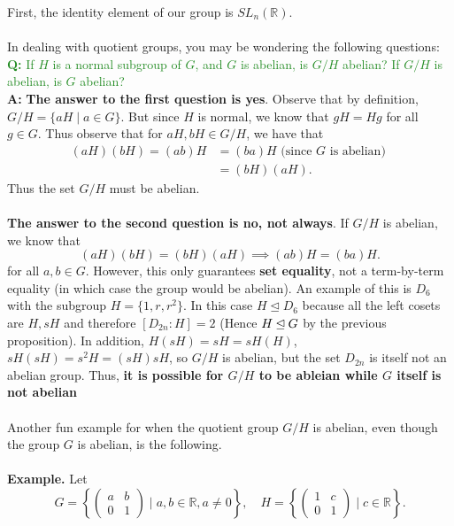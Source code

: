     First, the identity element of our group is $SL_n(\mathbb{R})$.
    \\
    \\
    \indent In dealing with quotient groups, you may be wondering the
    following questions:\\
    \textcolor{ForestGreen}{\textbf{Q:} If $H$ is a normal subgroup of
    $G$, and $G$ is abelian, is $G/H$ abelian? If $G/H$ is abelian, is
    $G$ abelian?}
    \\
    \textbf{A:} \textbf{The answer to the first question is yes}. 
    Observe that
        by definition, $G/H = \{aH \mid a \in G\}.$ But since $H$ 
        is normal, we know that $gH = Hg$ for all $g \in G$. 
        Thus observe that for $aH, bH \in G/H$, we have that 
        \begin{align*}
        (aH)(bH) =(ab)H &= (ba)H \text{ (since } G \text{ is abelian) }\\
        &= (bH)(aH).
        \end{align*}
        Thus the set $G/H$ must be abelian.
    \\
    \\
    \textbf{The answer to the second question is \textbf{no, not always}}. If $G/H$ is abelian, 
    we know that 
    $$
    (aH)(bH) = (bH)(aH) \implies (ab)H = (ba)H.
    $$ 
    for all $a, b \in G$. However, this only guarantees \textbf{set equality}, 
    not a term-by-term equality (in which case the group would be abelian). 
    An example of this is $D_{6}$ with the subgroup $H = \{1, r, r^2\}.$
    In this case $H \unlhd D_6$ because all the left cosets are $H, sH$ and therefore 
    $[D_{2n}: H] = 2$ (Hence $H \unlhd G$ by the previous proposition). In addition, 
    $H(sH) = sH=  sH(H)$, $sH(sH) = s^2H = (sH)sH$, so $G/H$ is abelian, but the set $D_{2n}$
    is itself not an abelian group. Thus, \textbf{it is possible for
    $G/H$ to be ableian while $G$ itself is not abelian }
    \\
    \\
    Another fun example for when the quotient group $G/H$ is abelian,
    even though the group $G$ is abelian, is the following.
    \\
    \\
    \textbf{Example.}
    Let 
    \[
        G = \left\{
        \begin{pmatrix}
            a & b \\
            0 & 1    
        \end{pmatrix} \mid a, b \in \mathbb{R}, a \ne 0\right\}, 
        \quad H = 
        \left\{
            \begin{pmatrix}
                1 & c \\
                0 & 1
            \end{pmatrix}
            \mid c \in \mathbb{R} 
        \right\}.   
    \]
